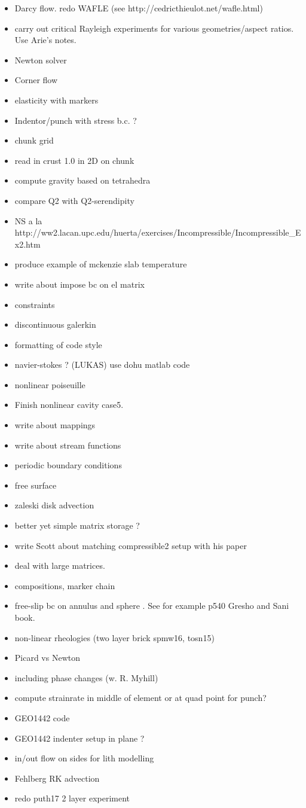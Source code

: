 
\begin{itemize}
\item Darcy flow. redo WAFLE (see http://cedricthieulot.net/wafle.html)
\item carry out critical Rayleigh experiments for various geometries/aspect ratios. Use Arie's notes. 
\item Newton solver
\item Corner flow 
\item elasticity with markers
\item Indentor/punch with stress b.c. ?
\item chunk grid
\item read in crust 1.0 in 2D on chunk
\item compute gravity based on tetrahedra
\item compare Q2 with Q2-serendipity
\item NS a la http://ww2.lacan.upc.edu/huerta/exercises/Incompressible/Incompressible\_Ex2.htm
\item produce example of mckenzie slab temperature
\item write about impose bc on el matrix
\item constraints
\item discontinuous galerkin
\item formatting of code style
\item navier-stokes ? (LUKAS) use dohu matlab code
\item nonlinear poiseuille
\item Finish nonlinear cavity case5.
\item write about mappings 
\item write about stream functions 
\item periodic boundary conditions
\item free surface 
\item zaleski disk advection
\item better yet simple matrix storage ?
\item write Scott about matching compressible2 setup with his paper
\item deal with large matrices. 
\item compositions, marker chain
\item free-slip bc on annulus and sphere . See for example p540 Gresho and Sani book.
\item non-linear rheologies (two layer brick spmw16, tosn15) 
\item Picard vs Newton
\item including phase changes (w. R. Myhill)
\item compute strainrate in middle of element or at quad point for punch?
\item GEO1442 code 
\item GEO1442 indenter setup in plane ?
\item in/out flow on sides for lith modelling
\item Fehlberg RK advection
\item redo puth17 2 layer experiment
\end{itemize}

